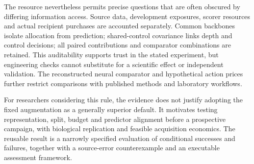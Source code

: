 The resource nevertheless permits precise questions that are often obscured by differing information access. Source data, development exposures, scorer resources and actual recipient purchases are accounted separately. Common backbones isolate allocation from prediction; shared-control covariance links depth and control decisions; all paired contributions and comparator combinations are retained. This auditability supports trust in the stated experiment, but engineering checks cannot substitute for a scientific effect or independent validation. The reconstructed neural comparator and hypothetical action prices further restrict comparisons with published methods and laboratory workflows.

For researchers considering this rule, the evidence does not justify adopting the fixed augmentation as a generally superior default. It motivates testing representation, split, budget and predictor alignment before a prospective campaign, with biological replication and feasible acquisition economics. The reusable result is a narrowly specified evaluation of conditional successes and failures, together with a source-error counterexample and an executable assessment framework.
